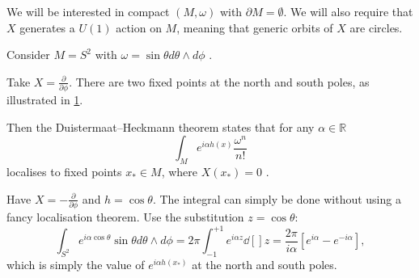We will be interested in compact $(M, \omega)$ with $\partial M = \emptyset$. We will also require that $X$ generates a $U(1)$ action on $M$, meaning that generic orbits of  $X$  are circles.
\begin{example}[]
  Consider $M = S^2$  with  $\omega = \sin \theta d\theta \wedge d\phi$ .
  \begin{figure}[tbhp]
    \centering
    \def\svgwidth{0.4\columnwidth}
    
    \caption{}
    \label{fig:l4f2}
  \end{figure}
  Take $X = \frac{\partial }{\partial \phi}$. There are two fixed points at the north and south poles, as illustrated in \ref{fig:l4f2}.
\end{example}
Then the Duistermaat--Heckmann theorem states that for any $\alpha \in \mathbb{R}$ 
\begin{equation}
  \int_M e^{i \alpha h(x)} \frac{\omega^n}{n!}
\end{equation}
localises to fixed points $x_* \in M$, where $X(x_*) = 0$ .

\begin{example}[$(M, \omega) = (S^2, \sin \theta d\theta \wedge d\phi)$]
  Have $X = - \frac{\partial }{\partial \phi}$ and $h = \cos \theta$. The integral can simply be done without using a fancy localisation theorem. Use the substitution $z = \cos \theta$:
  \begin{equation}
    \int_{S^2} e^{i \alpha \cos \theta} \sin \theta d\theta \wedge d\phi = 2 \pi \int_{-1}^{+1} e^{i \alpha z} \dd[]{z} = \frac{2 \pi}{i \alpha} \left[ e^{i \alpha} - e^{-i \alpha} \right],
  \end{equation}
  which is simply the value of $e^{i \alpha h(x_*)}$ at the north and south poles.
\end{example}

